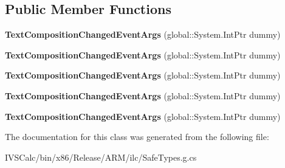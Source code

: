 \subsection*{Public Member Functions}
\begin{DoxyCompactItemize}
\item 
\mbox{\label{class_windows_1_1_u_i_1_1_xaml_1_1_controls_1_1_text_composition_changed_event_args_ad55301cf16ea0a8ea1df288dbd174180}} 
{\bfseries Text\+Composition\+Changed\+Event\+Args} (global\+::\+System.\+Int\+Ptr dummy)
\item 
\mbox{\label{class_windows_1_1_u_i_1_1_xaml_1_1_controls_1_1_text_composition_changed_event_args_ad55301cf16ea0a8ea1df288dbd174180}} 
{\bfseries Text\+Composition\+Changed\+Event\+Args} (global\+::\+System.\+Int\+Ptr dummy)
\item 
\mbox{\label{class_windows_1_1_u_i_1_1_xaml_1_1_controls_1_1_text_composition_changed_event_args_ad55301cf16ea0a8ea1df288dbd174180}} 
{\bfseries Text\+Composition\+Changed\+Event\+Args} (global\+::\+System.\+Int\+Ptr dummy)
\item 
\mbox{\label{class_windows_1_1_u_i_1_1_xaml_1_1_controls_1_1_text_composition_changed_event_args_ad55301cf16ea0a8ea1df288dbd174180}} 
{\bfseries Text\+Composition\+Changed\+Event\+Args} (global\+::\+System.\+Int\+Ptr dummy)
\item 
\mbox{\label{class_windows_1_1_u_i_1_1_xaml_1_1_controls_1_1_text_composition_changed_event_args_ad55301cf16ea0a8ea1df288dbd174180}} 
{\bfseries Text\+Composition\+Changed\+Event\+Args} (global\+::\+System.\+Int\+Ptr dummy)
\end{DoxyCompactItemize}


The documentation for this class was generated from the following file\+:\begin{DoxyCompactItemize}
\item 
I\+V\+S\+Calc/bin/x86/\+Release/\+A\+R\+M/ilc/Safe\+Types.\+g.\+cs\end{DoxyCompactItemize}
